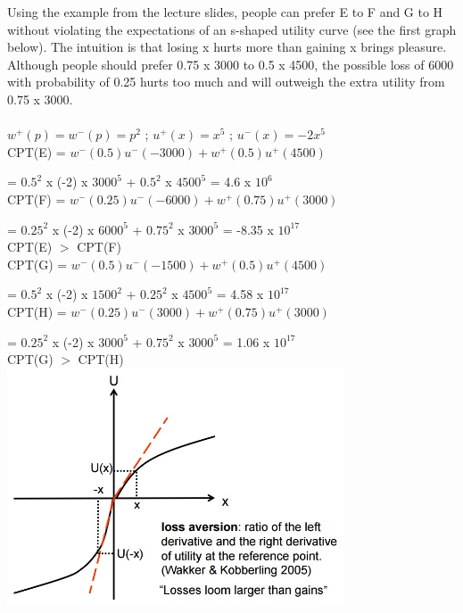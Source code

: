 \documentclass{article}
\begin{document}
Using the example from the lecture slides, people can prefer E to F and G to H without violating the expectations of an s-shaped utility curve (see the first graph below). The intuition is that losing x hurts more than gaining x brings pleasure. Although people should prefer 0.75 x 3000 to 0.5 x 4500, the possible loss of 6000 with probability of 0.25 hurts too much and will outweigh the extra utility from 0.75 x 3000.\\ \\ 

$w^+(p)=w^-(p)=p^2$  ;  
$u^+(x)=x^5$  ;  
$u^-(x)=-2x^5$ \\


CPT(E) = $w^-(0.5)u^-(-3000)+w^+(0.5)u^+(4500)$ 

= $0.5^2$ x (-2) x $3000^5$ + $0.5^2$ x $4500^5$ = 4.6 x $10^6$  \\

CPT(F) = $w^-(0.25)u^-(-6000)+w^+(0.75)u^+(3000)$

= $0.25^2$ x (-2) x $6000^5$ + $0.75^2$ x $3000^5$ = -8.35 x $10^{17}$ \\

CPT(E) $>$ CPT(F) \\

CPT(G) = $w^-(0.5)u^-(-1500)+w^+(0.5)u^+(4500)$

= $0.5^2$ x (-2) x $1500^2$ + $0.25^2$ x $4500^5$ = 4.58 x $10^{17}$ \\

CPT(H) = $w^-(0.25)u^-(3000)+w^+(0.75)u^+(3000)$

= $0.25^2$ x (-2) x $3000^5$ + $0.75^2$ x $3000^5$ = 1.06 x $10^{17}$ \\

CPT(G) $>$ CPT(H) \\



\includegraphics[width=10cm]{Figure1.png} \\
\end{document}
